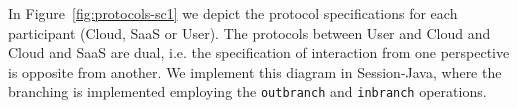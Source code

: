 \documentclass[10pt]{llncs}
\begin{document}
In Figure~\ref{fig:protocols-sc1} we depict the protocol specifications for each participant (Cloud, SaaS or User).
The protocols between User and Cloud and Cloud and SaaS are dual, i.e. the specification of interaction from one perspective is opposite from another.
We implement this diagram in Session-Java, where the branching is implemented employing the \texttt{outbranch} and \texttt{inbranch} operations.

\end{document}
